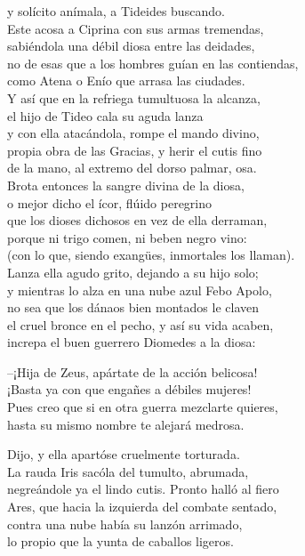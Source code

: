 \documentclass[11pt,twoside]{article}
\begin{document}
y solícito anímala, a Tideides buscando.\\
Este acosa a Ciprina con sus armas tremendas,\\
sabiéndola una débil diosa entre las deidades,\\
no de esas que a los hombres guían en las contiendas,\\
como Atena o Enío que arrasa las ciudades.\\
Y así que en la refriega tumultuosa la alcanza,\\
el hijo de Tideo cala su aguda lanza\\
y con ella atacándola, rompe el mando divino,\\
propia obra de las Gracias, y herir el cutis fino\\
de la mano, al extremo del dorso palmar, osa.\\
Brota entonces la sangre divina de la diosa,\\
o mejor dicho el ícor, flúido peregrino\\
que los dioses dichosos en vez de ella derraman,\\
porque ni trigo comen, ni beben negro vino:\\
(con lo que, siendo exangües, inmortales los llaman).\\
Lanza ella agudo grito, dejando a su hijo solo;\\
y mientras lo alza en una nube azul Febo Apolo,\\
no sea que los dánaos bien montados le claven\\
el cruel bronce en el pecho, y así su vida acaben,\\
increpa el buen guerrero Diomedes a la diosa:\par
--¡Hija de Zeus, apártate de la acción belicosa!\\
¡Basta ya con que engañes a débiles mujeres!\\
Pues creo que si en otra guerra mezclarte quieres,\\
hasta su mismo nombre te alejará medrosa.\par
Dijo, y ella apartóse cruelmente torturada.\\
La rauda Iris sacóla del tumulto, abrumada,\\
negreándole ya el lindo cutis. Pronto halló al fiero\\
Ares, que hacia la izquierda del combate sentado,\\
contra una nube había su lanzón arrimado,\\
lo propio que la yunta de caballos ligeros.\\
\end{document}
